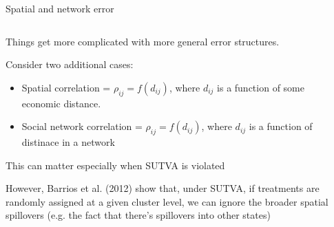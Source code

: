 \documentclass[notes,11pt, aspectratio=169]{beamer}
\newenvironment{wideitemize}{\itemize\addtolength{\itemsep}{10pt}}{\enditemize}
\begin{document}
\begin{frame}{Spatial and network error}
\begin{columns}[T] %
\begin{column}{.8\textwidth}
  \begin{wideitemize}
  \item Things get more complicated with more general error structures.
  \item Consider two additional cases:
    \begin{itemize}
    \item Spatial correlation = $\rho_{ij} = f(d_{ij})$, where $d_{ij}$ is a function of some economic distance.
    \item Social network correlation = $\rho_{ij} = f(d_{ij})$, where $d_{ij}$ is a function of distinace in a network
    \end{itemize}
  \item This can matter especially when SUTVA is violated
  \item However, Barrios et al. (2012) show that, under SUTVA, if
    treatments are randomly assigned at a given cluster level, we can
    ignore the broader spatial spillovers (e.g. the fact that there's
    spillovers into other states)
  \end{wideitemize}
  \end{column}%
  \hfill%
  \begin{column}{.5\textwidth}
  \end{column}
\end{columns}
  
\end{frame}
\end{document}
